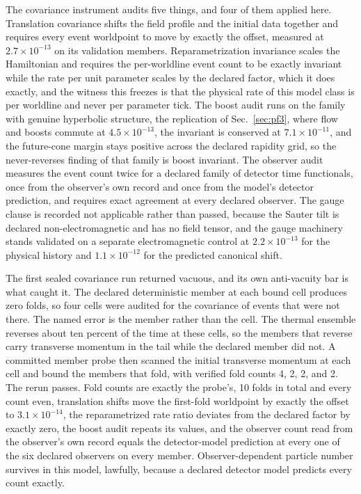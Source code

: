 \documentclass[aps,pre,reprint,nofootinbib,floatfix]{revtex4-2}
\begin{document}
The covariance instrument audits five things, and four of them applied
here.  Translation covariance shifts the field profile and the initial
data together and requires every event worldpoint to move by exactly
the offset, measured at $2.7 \times 10^{-13}$ on its validation
members.  Reparametrization invariance scales the Hamiltonian and
requires the per-worldline event count to be exactly invariant while
the rate per unit parameter scales by the declared factor, which it
does exactly, and the witness this freezes is that the physical rate of
this model class is per worldline and never per parameter tick.  The
boost audit runs on the family with genuine hyperbolic structure, the
replication of Sec.~\ref{sec:pf3}, where flow and boosts commute at
$4.5 \times 10^{-13}$, the invariant is conserved at
$7.1 \times 10^{-11}$, and the future-cone margin stays positive across
the declared rapidity grid, so the never-reverses finding of that
family is boost invariant.  The observer audit measures the event count
twice for a declared family of detector time functionals, once from the
observer's own record and once from the model's detector prediction,
and requires exact agreement at every declared observer.  The gauge
clause is recorded not applicable rather than passed, because the
Sauter tilt is declared non-electromagnetic and has no field tensor,
and the gauge machinery stands validated on a separate electromagnetic
control at $2.2 \times 10^{-13}$ for the physical history and
$1.1 \times 10^{-12}$ for the predicted canonical shift.

The first sealed covariance run returned vacuous, and its own
anti-vacuity bar is what caught it.  The declared deterministic member
at each bound cell produces zero folds, so four cells were audited for
the covariance of events that were not there.  The named error is the
member rather than the cell.  The thermal ensemble reverses about ten
percent of the time at these cells, so the members that reverse carry
transverse momentum in the tail while the declared member did not.  A
committed member probe then scanned the initial transverse momentum at
each cell and bound the members that fold, with verified fold counts 4,
2, 2, and 2.  The rerun passes.  Fold counts are exactly the probe's,
10 folds in total and every count even, translation shifts move the
first-fold worldpoint by exactly the offset to
$3.1 \times 10^{-14}$, the reparametrized rate ratio deviates from the
declared factor by exactly zero, the boost audit repeats its values,
and the observer count read from the observer's own record equals the
detector-model prediction at every one of the six declared observers on
every member.  Observer-dependent particle number survives in this
model, lawfully, because a declared detector model predicts every count
exactly.
\end{document}
